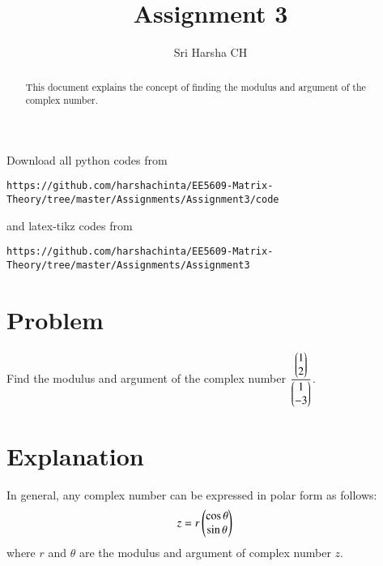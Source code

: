 \documentclass[journal,12pt,twocolumn]{IEEEtran}
\begin{document}
\renewcommand{\thefigure}{\theproblem}

\def\putbox#1#2#3{\makebox[0in][l]{\makebox[#1][l]{}\raisebox{\baselineskip}[0in][0in]{\raisebox{#2}[0in][0in]{#3}}}}
     \def\rightbox#1{\makebox[0in][r]{#1}}
     \def\centbox#1{\makebox[0in]{#1}}
     \def\topbox#1{\raisebox{-\baselineskip}[0in][0in]{#1}}
     \def\midbox#1{\raisebox{-0.5\baselineskip}[0in][0in]{#1}}
\vspace{3cm}
\title{Assignment 3}
\author{Sri Harsha CH}

\maketitle
\newpage

\bigskip
\renewcommand{\thefigure}{\theenumi}
\renewcommand{\thetable}{\theenumi}

\begin{abstract}
This document explains the concept of finding the modulus and argument of the complex number.
\end{abstract}

Download all python codes from 
\begin{lstlisting}
https://github.com/harshachinta/EE5609-Matrix-Theory/tree/master/Assignments/Assignment3/code
\end{lstlisting}
%
and latex-tikz codes from 
%
\begin{lstlisting}
https://github.com/harshachinta/EE5609-Matrix-Theory/tree/master/Assignments/Assignment3
\end{lstlisting}
%
\section{Problem}
Find the modulus and argument of the complex number $\frac{\begin{pmatrix}1\\ 2\end{pmatrix}}{\begin{pmatrix}1\\ -3\end{pmatrix}}$.
\section{Explanation}
In general, any complex number can be expressed in polar form as follows:
\begin{align}  \label{eq:eq_1}
& z = r\begin{pmatrix}\cos{\theta}\\ \sin{\theta}\end{pmatrix}
\end{align}
where $r$ and $\theta$ are the modulus and argument of complex number $z$.
\end{document}
